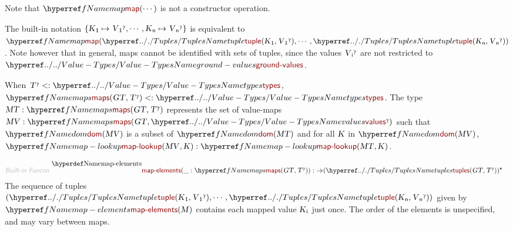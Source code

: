 Note that $\SHADE{\NAMEREF{map}
           ( \cdots )}$ is not a constructor operation.

The built-in notation $\SHADE{\{ \VAR{K}\SUB{1} \mapsto 
              \VAR{V}\SUB{1}\QUERY, \cdots, \VAR{K}\SUB{n} \mapsto 
              \VAR{V}\SUB{n}\QUERY \}}$ is equivalent to 
  $\SHADE{\NAMEREF{map}
           ( \NAMEHYPER{../.}{Tuples}{tuple}
               ( \VAR{K}\SUB{1},    
                 \VAR{V}\SUB{1}\QUERY ),   
             \cdots,   
             \NAMEHYPER{../.}{Tuples}{tuple}
               ( \VAR{K}\SUB{n},    
                 \VAR{V}\SUB{n}\QUERY ) )}$. Note however that in general, 
  maps cannot be identified with sets of tuples, since the values $\SHADE{\VAR{V}\SUB{i}\QUERY}$ are 
  not restricted to $\SHADE{\NAMEHYPER{../..}{Value-Types}{ground-values}}$.

When $\SHADE{\VAR{T}\QUERY <: \NAMEHYPER{../..}{Value-Types}{types}}$, $\SHADE{\NAMEREF{maps}
           ( \VAR{GT},   
             \VAR{T}\QUERY ) <: \NAMEHYPER{../..}{Value-Types}{types}}$. The type $\SHADE{\VAR{MT} : \NAMEREF{maps}
                     ( \VAR{GT},   
                       \VAR{T}\QUERY )}$
  represents the set of value-maps $\SHADE{\VAR{MV} : \NAMEREF{maps}
                     ( \VAR{GT},   
                       \NAMEHYPER{../..}{Value-Types}{values}\QUERY )}$ such that 
  $\SHADE{\NAMEREF{dom}
           ( \VAR{MV} )}$ is a subset of $\SHADE{\NAMEREF{dom}
           ( \VAR{MT} )}$ and for all $\SHADE{\VAR{K}}$ in $\SHADE{\NAMEREF{dom}
           ( \VAR{MV} )}$, 
  $\SHADE{ \NAMEREF{map-lookup}
                       ( \VAR{MV},   
                         \VAR{K} ) : \NAMEREF{map-lookup}
                                 ( \VAR{MT},   
                                   \VAR{K} )}$.

\begin{align*}
  \KEY{Built-in Funcon} ~ 
  & \NAMEDECL{map-elements}(\_ : \NAMEREF{maps}
                                ( \VAR{GT},   
                                  \VAR{T}\QUERY )) :  \TO ( \NAMEHYPER{../.}{Tuples}{tuples}
                                                                           ( \VAR{GT},   
                                                                             \VAR{T}\QUERY ) )\STAR
\end{align*}
The sequence of tuples $\SHADE{( \NAMEHYPER{../.}{Tuples}{tuple}
             ( \VAR{K}\SUB{1},   
               \VAR{V}\SUB{1}\QUERY ),  
           \cdots,  
           \NAMEHYPER{../.}{Tuples}{tuple}
             ( \VAR{K}\SUB{n},   
               \VAR{V}\SUB{n}\QUERY ) )}$ given by
  $\SHADE{\NAMEREF{map-elements}
           ( \VAR{M} )}$ contains each mapped value $\SHADE{\VAR{K}\SUB{i}}$ just once. The order of
  the elements is unspecified, and may vary between maps.

